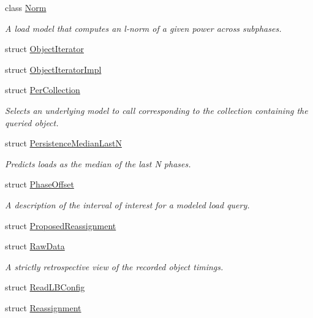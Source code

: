 \begin{DoxyCompactItemize}
class \hyperlink{classvt_1_1vrt_1_1collection_1_1balance_1_1_norm}{Norm}
\begin{DoxyCompactList}\small\item\em A load model that computes an l-\/norm of a given power across subphases. \end{DoxyCompactList}\item 
struct \hyperlink{structvt_1_1vrt_1_1collection_1_1balance_1_1_object_iterator}{Object\+Iterator}
\item 
struct \hyperlink{structvt_1_1vrt_1_1collection_1_1balance_1_1_object_iterator_impl}{Object\+Iterator\+Impl}
\item 
struct \hyperlink{structvt_1_1vrt_1_1collection_1_1balance_1_1_per_collection}{Per\+Collection}
\begin{DoxyCompactList}\small\item\em Selects an underlying model to call corresponding to the collection containing the queried object. \end{DoxyCompactList}\item 
struct \hyperlink{structvt_1_1vrt_1_1collection_1_1balance_1_1_persistence_median_last_n}{Persistence\+Median\+LastN}
\begin{DoxyCompactList}\small\item\em Predicts loads as the median of the last N phases. \end{DoxyCompactList}\item 
struct \hyperlink{structvt_1_1vrt_1_1collection_1_1balance_1_1_phase_offset}{Phase\+Offset}
\begin{DoxyCompactList}\small\item\em A description of the interval of interest for a modeled load query. \end{DoxyCompactList}\item 
struct \hyperlink{structvt_1_1vrt_1_1collection_1_1balance_1_1_proposed_reassignment}{Proposed\+Reassignment}
\item 
struct \hyperlink{structvt_1_1vrt_1_1collection_1_1balance_1_1_raw_data}{Raw\+Data}
\begin{DoxyCompactList}\small\item\em A strictly retrospective view of the recorded object timings. \end{DoxyCompactList}\item 
struct \hyperlink{structvt_1_1vrt_1_1collection_1_1balance_1_1_read_l_b_config}{Read\+L\+B\+Config}
\item 
struct \hyperlink{structvt_1_1vrt_1_1collection_1_1balance_1_1_reassignment}{Reassignment}

\end{DoxyCompactItemize}
